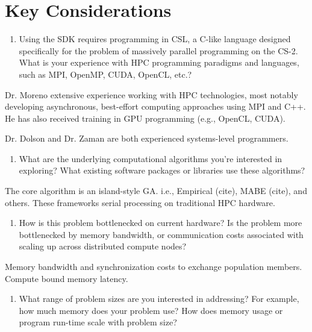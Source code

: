 \section{Key Considerations} \label{sec:key-considerations}

\begin{enumerate} \itshape
\item Using the SDK requires programming in CSL, a C-like language designed specifically for the problem of massively parallel programming on the CS-2.
What is your experience with HPC programming paradigms and languages, such as MPI, OpenMP, CUDA, OpenCL, etc.?
\end{enumerate}

Dr. Moreno extensive experience working with HPC technologies, most notably developing asynchronous, best-effort computing approaches using MPI and C++.
He has also received training in GPU programming (e.g., OpenCL, CUDA).

Dr. Dolson and Dr. Zaman are both experienced systems-level programmers.

\begin{enumerate}[resume] \itshape
\item What are the underlying computational algorithms you're interested in exploring?
What existing software packages or libraries use these algorithms?
\end{enumerate}

The core algorithm is an island-style GA.
i.e., Empirical (cite), MABE (cite), and others.
These frameworks serial processing on traditional HPC hardware.

\begin{enumerate}[resume] \itshape
\item How is this problem bottlenecked on current hardware?
Is the problem more bottlenecked by memory bandwidth, or communication costs associated with scaling up across distributed compute nodes?
\end{enumerate}

Memory bandwidth and synchronization costs to exchange population members.
Compute bound memory latency.

\begin{enumerate}[resume] \itshape
\item What range of problem sizes are you interested in addressing?
For example, how much memory does your problem use?
How does memory usage or program run-time scale with problem size?
\end{enumerate}

